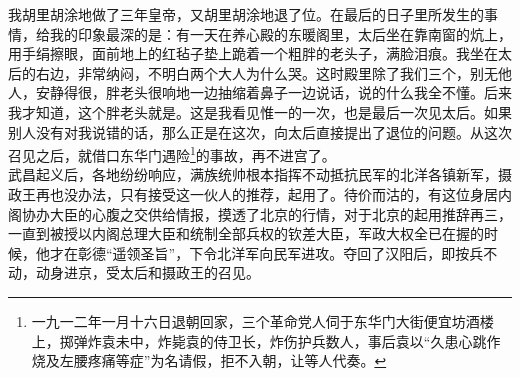 我胡里胡涂地做了三年皇帝，又胡里胡涂地退了位。在最后的日子里所发生的事情，给我的印象最深的是：有一天在养心殿的东暖阁里，太后坐在靠南窗的炕上，用手绢擦眼，面前地上的红毡子垫上跪着一个粗胖的老头子，满脸泪痕。我坐在太后的右边，非常纳闷，不明白两个大人为什么哭。这时殿里除了我们三个，别无他人，安静得很，胖老头很响地一边抽缩着鼻子一边说话，说的什么我全不懂。后来我才知道，这个胖老头就是。这是我看见惟一的一次，也是最后一次见太后。如果别人没有对我说错的话，那么正是在这次，向太后直接提出了退位的问题。从这次召见之后，就借口东华门遇险\footnote{一九一二年一月十六日退朝回家，三个革命党人伺于东华门大街便宜坊酒楼上，掷弹炸袁未中，炸毙袁的侍卫长，炸伤护兵数人，事后袁以“久患心跳作烧及左腰疼痛等症”为名请假，拒不入朝，让等人代奏。}的事故，再不进宫了。\\

武昌起义后，各地纷纷响应，满族统帅根本指挥不动抵抗民军的北洋各镇新军，摄政王再也没办法，只有接受这一伙人的推荐，起用了。待价而沽的，有这位身居内阁协办大臣的心腹之交供给情报，摸透了北京的行情，对于北京的起用推辞再三，一直到被授以内阁总理大臣和统制全部兵权的钦差大臣，军政大权全已在握的时候，他才在彰德“遥领圣旨”，下令北洋军向民军进攻。夺回了汉阳后，即按兵不动，动身进京，受太后和摄政王的召见。\\

